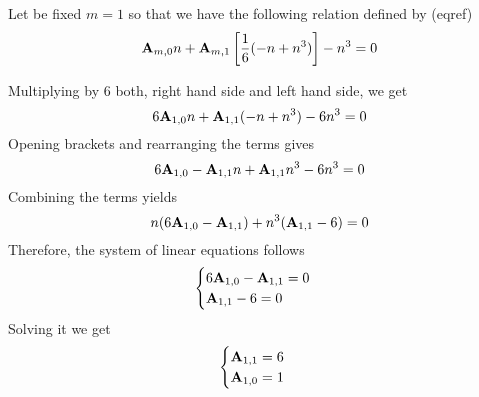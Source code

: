 \begin{examp}
    Let be fixed $m=1$ so that we have the following relation defined by (eqref)
    \begin{equation*}
        {\mathbf{A}} \sb{m,0} n + {\mathbf{A}} \sb{m,1} \left[ \frac{1}{6} (-n + n^3) \right] -n^3 = 0
    \end{equation*}
\end{examp}
Multiplying by $6$ both, right hand side and left hand side, we get
\begin{equation*}
    6{\mathbf{A}} \sb{1,0} n + {\mathbf{A}} \sb{1,1} (-n + n^3) - 6n^3 = 0
\end{equation*}
Opening brackets and rearranging the terms gives
\begin{equation*}
    6 {\mathbf{A}} \sb{1,0} - {\mathbf{A}} \sb{1,1} n + {\mathbf{A}} \sb{1,1} n^3 - 6n^3 = 0
\end{equation*}
Combining the terms yields
\begin{equation*}
    n(6{\mathbf{A}} \sb{1,0} - {\mathbf{A}} \sb{1,1}) + n^3 ({\mathbf{A}} \sb{1,1} - 6) = 0
\end{equation*}
Therefore, the system of linear equations follows
\begin{equation*}
    \begin{cases}
        6 {\mathbf{A}} \sb{1,0} - {\mathbf{A}} \sb{1,1} = 0 \\
        {\mathbf{A}} \sb{1,1} - 6 = 0
    \end{cases}
\end{equation*}
Solving it we get
\begin{equation*}
    \begin{cases}
        {\mathbf{A}} \sb{1,1} = 6 \\
        {\mathbf{A}} \sb{1,0} = 1
    \end{cases}
\end{equation*}
